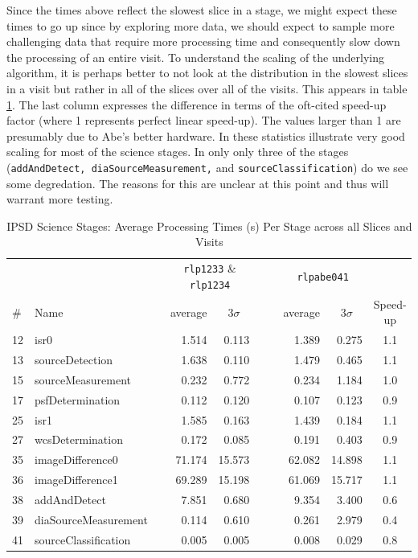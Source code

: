 Since the times above reflect the slowest slice in a stage, we might
expect these times to go up since by exploring more data, we should
expect to sample more challenging data that require more processing
time and consequently slow down the processing of an entire visit.  To
understand the scaling of the underlying algorithm, it is perhaps
better to not look at the distribution in the slowest slices in a
visit but rather in all of the slices over all of the visits.  This
appears in table \ref{tbl:allscislices}.  The last column expresses
the difference in terms of the oft-cited speed-up factor (where 1
represents perfect linear speed-up).  The values larger than 1 are
presumably due to Abe's better hardware.  In these statistics
illustrate very good scaling for most of the science stages.  In only 
only three of the stages ({\tt addAndDetect, diaSourceMeasurement,}
and {\tt sourceClassification}) do we see some degredation.  The
reasons for this are unclear at this point and thus will warrant more
testing.  

\begin{table}[htbp]
\begin{center}
\caption{IPSD Science Stages: Average Processing Times (s) Per Stage across all
  Slices and Visits
\label{tbl:allscislices}}
\vspace{\baselineskip}
\begin{tabular}{llcrrc|crr|c}
\hline\hline
   &      && \multicolumn{2}{c}{{\tt rlp1233} \& {\tt rlp1234}} 
         &&& \multicolumn{2}{c|}{{\tt rlpabe041}} & \\
\# & Name && \multicolumn{1}{c}{average}&\multicolumn{1}{c}{$3\sigma$} 
         &&& \multicolumn{1}{c}{average}&\multicolumn{1}{c|}{$3\sigma$} 
   & Speed-up \\ 
\hline
12 &                 isr0 &&  1.514 &  0.113 &&&  1.389 &  0.275 & 1.1 \\  %
13 &      sourceDetection &&  1.638 &  0.110 &&&  1.479 &  0.465 & 1.1 \\  %
15 &    sourceMeasurement &&  0.232 &  0.772 &&&  0.234 &  1.184 & 1.0 \\  %
17 &     psfDetermination &&  0.112 &  0.120 &&&  0.107 &  0.123 & 0.9 \\  %
25 &                 isr1 &&  1.585 &  0.163 &&&  1.439 &  0.184 & 1.1 \\  %
27 &     wcsDetermination &&  0.172 &  0.085 &&&  0.191 &  0.403 & 0.9 \\  %
35 &     imageDifference0 && 71.174 & 15.573 &&& 62.082 & 14.898 & 1.1 \\  %
36 &     imageDifference1 && 69.289 & 15.198 &&& 61.069 & 15.717 & 1.1 \\  %
38 &         addAndDetect &&  7.851 &  0.680 &&&  9.354 &  3.400 & 0.6 \\  %
39 & diaSourceMeasurement &&  0.114 &  0.610 &&&  0.261 &  2.979 & 0.4 \\  %
41 & sourceClassification &&  0.005 &  0.005 &&&  0.008 &  0.029 & 0.8 \\  %
\hline
\end{tabular}
\end{center}
\end{table}

